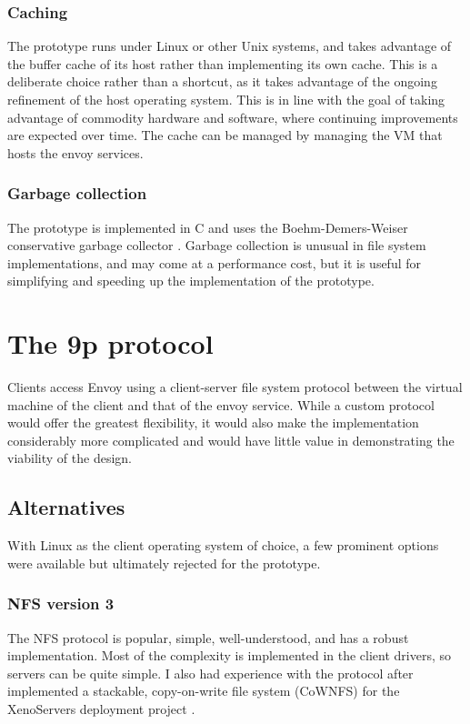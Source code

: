 \subsubsection{Caching}

The prototype runs under Linux or other Unix systems, and takes advantage of the buffer cache of its host rather than implementing its own cache. This is a deliberate choice rather than a shortcut, as it takes advantage of the ongoing refinement of the host operating system. This is in line with the goal of taking advantage of commodity hardware and software, where continuing improvements are expected over time. The cache can be managed by managing the VM that hosts the envoy services.

\subsubsection{Garbage collection}

The prototype is implemented in C and uses the Boehm-Demers-Weiser conservative garbage collector \cite{boehm}. Garbage collection is unusual in file system implementations, and may come at a performance cost, but it is useful for simplifying and speeding up the implementation of the prototype.

\section{The 9p protocol}

Clients access Envoy using a client-server file system protocol between the virtual machine of the client and that of the envoy service. While a custom protocol would offer the greatest flexibility, it would also make the implementation considerably more complicated and would have little value in demonstrating the viability of the design.

\subsection{Alternatives}

With Linux as the client operating system of choice, a few prominent options were available but ultimately rejected for the prototype.

\subsubsection{NFS version 3}

The NFS protocol is popular, simple, well-understood, and has a robust implementation. Most of the complexity is implemented in the client drivers, so servers can be quite simple. I also had experience with the protocol after implemented a stackable, copy-on-write file system (CoWNFS) for the XenoServers deployment project \cite{kotsovinos04b}.

